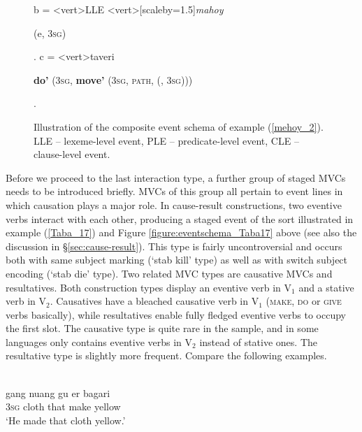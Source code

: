 {\begin{figure}
\!b = <vert>{LLE}
<vert>[scaleby=1.5]{\textit{mahoy}}
{\begin{scriptsize} \textbf{} (e, 3\textsc{sg})\end{scriptsize}}.
\!c = <vert>{taveri}
{\begin{scriptsize} \textbf{do'} (3\textsc{sg}, \textbf{move'} (3\textsc{sg}, \textsc{path}, \textbf{} (, 3\textsc{sg}))) \end{scriptsize}}.
\endjtree

\caption[Event schema illustration of example (\ref{mehoy_2})]{Illustration of the composite event schema of example (\ref{mehoy_2}). LLE -- lexeme-level event, PLE -- predicate-level event, CLE -- clause-level event.}
\label{figure:eventschema_mehoy_2}
\end{figure}

Before we proceed to the last interaction type, a further group of staged MVCs needs to be introduced briefly. MVCs of this group all pertain to event lines in which causation plays a major role. In cause-result constructions, two eventive verbs interact with each other, producing a staged event of the sort illustrated in example (\ref{Taba_17}) and Figure \ref{figure:eventschema_Taba17} above (see also the discussion in §\ref{sec:cause-result}). This type is fairly uncontroversial and occurs both with same subject marking (`stab kill' type) as well as with switch subject encoding (`stab die' type). Two related MVC types are causative MVCs and resultatives. Both construction types display an eventive verb in V$_1$ and a stative verb in V$_2$. Causatives have a bleached causative verb in V$_1$ (\textsc{make}, \textsc{do} or \textsc{give} verbs basically), while resultatives enable fully fledged eventive verbs to occupy the first slot. The causative type is quite rare in the sample, and in some languages only contains eventive verbs in V$_2$ instead of stative ones. The resultative type is slightly more frequent. Compare the following examples.

\ea \label{Kaera20}
\\
\gll gang nuang gu er bagari \\
3\textsc{sg} cloth that make yellow \\
\glft `He made that cloth yellow.' \\ 
\z

}
